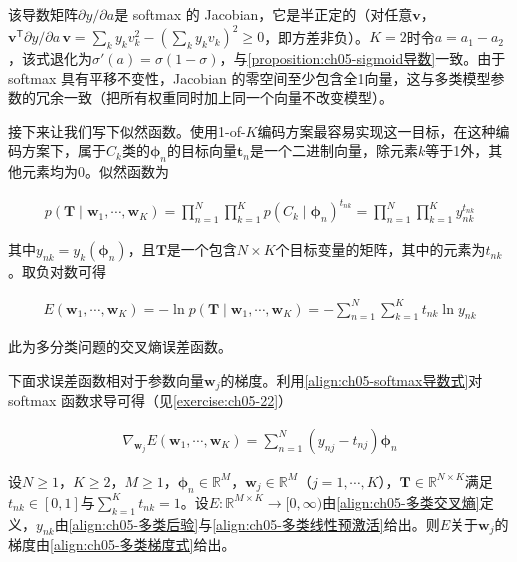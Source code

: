 \documentclass[../../main.tex]{subfiles}
\begin{document}
\begin{remark}
该导数矩阵$\partial y/\partial a$是 softmax 的 Jacobian，它是半正定的（对任意$\boldsymbol{v}$，$\boldsymbol{v}^{\mathsf{T}}\partial y/\partial a\,\boldsymbol{v}=\sum_k y_k v_k^{2}-(\sum_k y_kv_k)^{2}\geqslant0$，即方差非负）。$K=2$时令$a=a_1-a_2$，该式退化为$\sigma'(a)=\sigma(1-\sigma)$，与\cref{proposition:ch05-sigmoid导数}一致。由于 softmax 具有平移不变性，Jacobian 的零空间至少包含全1向量，这与多类模型参数的冗余一致（把所有权重同时加上同一个向量不改变模型）。
\end{remark}

接下来让我们写下似然函数。使用1-of-$K$编码方案最容易实现这一目标，在这种编码方案下，属于$C_k$类的$\boldsymbol{\phi}_n$的目标向量$\boldsymbol{t}_n$是一个二进制向量，除元素$k$等于1外，其他元素均为0。似然函数为

\begin{align}
  p(\boldsymbol{T}\mid\boldsymbol{w}_1,\cdots,\boldsymbol{w}_K)=\prod_{n=1}^{N}\prod_{k=1}^{K}p(C_k\mid\boldsymbol{\phi}_n)^{t_{nk}}=\prod_{n=1}^{N}\prod_{k=1}^{K}y_{nk}^{t_{nk}}
  \label{align:ch05-多类似然}
\end{align}

其中$y_{nk}=y_k(\boldsymbol{\phi}_n)$，且$\boldsymbol{T}$是一个包含$N\times K$个目标变量的矩阵，其中的元素为$t_{nk}$。取负对数可得

\begin{align}
  E(\boldsymbol{w}_1,\cdots,\boldsymbol{w}_K)=-\ln p(\boldsymbol{T}\mid\boldsymbol{w}_1,\cdots,\boldsymbol{w}_K)=-\sum_{n=1}^{N}\sum_{k=1}^{K}t_{nk}\ln y_{nk}
  \label{align:ch05-多类交叉熵}
\end{align}

此为多分类问题的交叉熵误差函数。

下面求误差函数相对于参数向量$\boldsymbol{w}_j$的梯度。利用\eqref{align:ch05-softmax导数式}对 softmax 函数求导可得（见\cref{exercise:ch05-22}）

\begin{align}
  \nabla_{\boldsymbol{w}_j}E(\boldsymbol{w}_1,\cdots,\boldsymbol{w}_K)=\sum_{n=1}^{N}\left(y_{nj}-t_{nj}\right)\boldsymbol{\phi}_n
  \label{align:ch05-多类梯度式}
\end{align}

\begin{proposition}[多类交叉熵误差的梯度]\label{proposition:ch05-多类梯度}
设$N\geqslant1$，$K\geqslant2$，$M\geqslant1$，$\boldsymbol{\phi}_n\in\mathbb{R}^{M}$，$\boldsymbol{w}_j\in\mathbb{R}^{M}$（$j=1,\cdots,K$），$\boldsymbol{T}\in\mathbb{R}^{N\times K}$满足$t_{nk}\in[0,1]$与$\sum_{k=1}^{K}t_{nk}=1$。设$E:\mathbb{R}^{M\times K}\to[0,\infty)$由\eqref{align:ch05-多类交叉熵}定义，$y_{nk}$由\eqref{align:ch05-多类后验}与\eqref{align:ch05-多类线性预激活}给出。则$E$关于$\boldsymbol{w}_j$的梯度由\eqref{align:ch05-多类梯度式}给出。
\end{proposition}
\end{document}
